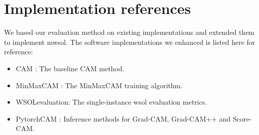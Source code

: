 \section{Implementation references}
We based our evaluation method on existing implementations and extended them to implement \acrlong{mwsol}. The software implementations we enhanced is listed here for reference:
\begin{itemize}
    \item CAM \cite{code:CAM}: The baseline CAM method.
    \item MinMaxCAM \cite{code:MinMaxCAM}: The MinMaxCAM training algorithm.
    \item WSOLevaluation\cite{code:WSOLevaluation}: The single-instance \acrshort{wsol} evaluation metrics.
    \item PytorchCAM \cite{code:PytorchCAM}: Inference methods for Grad-CAM, Grad-CAM++ and Score-CAM.
\end{itemize}